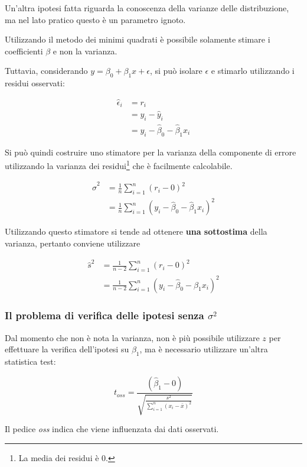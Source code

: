 Un'altra ipotesi fatta riguarda la conoscenza della varianze delle
distribuzione, ma nel lato pratico questo è un parametro ignoto.

Utilizzando il metodo dei minimi quadrati è possibile solamente stimare
i coefficienti $\beta$ e non la varianza.

Tuttavia, considerando $y = \beta_0 + \beta_1x + \epsilon$, si può
isolare $\epsilon$ e stimarlo utilizzando i residui osservati:

\begin{align*}
	\hat{\epsilon}_i  &= r_i \\ 
								&= y_i - \hat{y}_i\\
								  &= y_i - \hat{\beta}_0 - \hat{\beta}_1x_i
\end{align*}


Si può quindi costruire uno stimatore per la varianza della componente di
errore utilizzando la varianza dei residui\footnote{La media dei residui è 0.} che è facilmente calcolabile.

\begin{align*} 
	\hat{\sigma}^2 &= \frac{1}{n}\sum\limits_{i=1}^n (r_{i} - 0)^2\\
								&= \frac{1}{n}\sum\limits_{i=1}^n (y_i - \hat{\beta}_0 - \hat{\beta}_1x_i)^2
\end{align*}

Utilizzando questo stimatore si tende ad ottenere \textbf{una sottostima} della varianza, pertanto conviene utilizzare

\begin{align*} 
\hat{s}^2 &= \frac{1}{n-2}\sum\limits_{i=1}^n (r_{i} - 0)^2\\
				 &= \frac{1}{n-2}\sum\limits_{i=1}^n (y_i - \hat{\beta}_0 - \hat{\beta}_1x_i)^2
\end{align*}

\subsubsection{Il problema di verifica delle ipotesi senza $\sigma^2$}\label{il-problema-di-verifica-delle-ipotesi-senza-sigma2}

Dal momento che non è nota la varianza, non è più possibile utilizzare $ z $ per effettuare la verifica dell'ipotesi su $ \beta_1 $, ma è necessario utilizzare un'altra statistica test:

$$
t_{oss} = \frac{(\hat{\beta}_1 - 0)}{\sqrt{\frac{s^2}{\sum_{i=1}^{n} (x_i - \bar{x})^2}}}
$$

Il pedice \textit{oss} indica che viene influenzata dai dati osservati.

